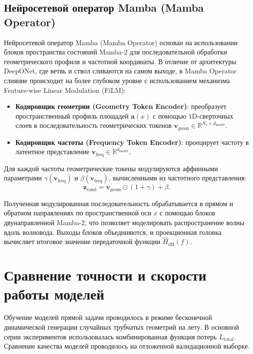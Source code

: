 \subsection{Нейросетевой оператор Mamba (Mamba Operator)}
\label{subsec:mamba_operator}

Нейросетевой оператор Mamba (Mamba Operator) основан на использовании блоков пространства состояний Mamba-2 для последовательной обработки геометрического профиля и частотной координаты. В отличие от архитектуры DeepONet, где ветвь и ствол сливаются на самом выходе, в Mamba Operator слияние происходит на более глубоком уровне с использованием механизма Feature-wise Linear Modulation (FiLM):
\begin{itemize}
    \item \textbf{Кодировщик геометрии (Geometry Token Encoder)}: преобразует пространственный профиль площадей $\mathbf{a}(x)$ с помощью 1D-сверточных слоев в последовательность геометрических токенов $\mathbf{v}_{\text{geom}} \in \mathbb{R}^{N_s \times d_{\text{model}}}$.
    \item \textbf{Кодировщик частоты (Frequency Token Encoder)}: проецирует частоту в латентное представление $\mathbf{v}_{\text{freq}} \in \mathbb{R}^{d_{\text{model}}}$.
\end{itemize}

Для каждой частоты геометрические токены модулируются аффинными параметрами $\gamma(\mathbf{v}_{\text{freq}})$ и $\beta(\mathbf{v}_{\text{freq}})$, вычисленными из частотного представления:
\begin{equation}
    \mathbf{z}_{\text{cond}} = \mathbf{v}_{\text{geom}} \odot (1 + \gamma) + \beta.
\end{equation}

Полученная модулированная последовательность обрабатывается в прямом и обратном направлениях по пространственной оси $x$ с помощью блоков двунаправленной Mamba-2, что позволяет моделировать распространение волны вдоль волновода. Выходы блоков объединяются, и проекционная головка вычисляет итоговое значение передаточной функции $\widehat{H}_{\text{dB}}(f)$.

\section{Сравнение точности и скорости работы моделей}
\label{sec:comparison_results}

Обучение моделей прямой задачи проводилось в режиме бесконечной динамической генерации случайных трубчатых геометрий на лету. В основной серии экспериментов использовалась комбинированная функция потерь $L_{\text{total}}$. Сравнение качества моделей проводилось на отложенной валидационной выборке.

